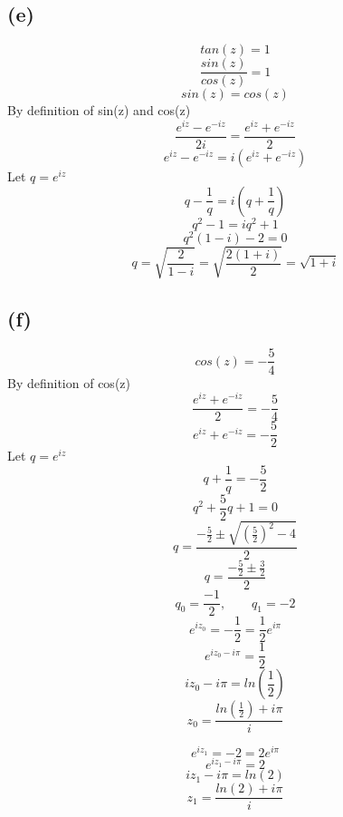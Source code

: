 \documentclass{article}
\begin{document}
\subsection*{(e)}
\[
   tan(z) = 1
\]
\[
   \frac{sin(z)}{cos(z)} = 1
\]
\[
   sin(z) = cos(z)
\]
By definition of sin(z) and cos(z)
\[
   \frac{e^{iz} - e^{-iz}}{2i} = \frac{e^{iz} + e^{-iz}}{2}
\]
\[
   e^{iz} - e^{-iz} = i(e^{iz} + e^{-iz})
\]
Let \(q = e^{iz}\)
\[
   q - \frac{1}{q} = i(q + \frac{1}{q})
\]
\[
   q^2 - 1 = iq^2 + 1
\]
\[
   q^2(1-i) - 2 = 0
\]
\[
   q = \sqrt{\frac{2}{1-i}} = \sqrt{\frac{2(1+i)}{2}} = \sqrt{1 + i}
\]

\subsection*{(f)}
\[
   cos(z) = -\frac{5}{4}
\]
By definition of cos(z)
\[
   \frac{e^{iz} + e^{-iz}}{2} = -\frac{5}{4}
\]
\[
   e^{iz} + e^{-iz} = -\frac{5}{2}
\]
Let \(q = e^{iz}\)
\[
   q + \frac{1}{q} = -\frac{5}{2}
\]
\[
   q^2 + \frac{5}{2}q + 1 = 0
\]
\[
   q = \frac{-\frac{5}{2} \pm \sqrt{(\frac{5}{2})^2 - 4}}{2}
\]
\[
   q = \frac{-\frac{5}{2} \pm \frac{3}{2}}{2}
\]
\[
   q_0 = \frac{-1}{2}, \qquad q_1 = -2
\]
\[
   e^{iz_0} = -\frac{1}{2} = \frac{1}{2}e^{i\pi}
\]
\[
   e^{iz_0 -i\pi} = \frac{1}{2}
\]
\[
   iz_0 - i\pi = ln(\frac{1}{2})
\]
\[
   z_0 = \frac{ln(\frac{1}{2}) + i\pi}{i}
\]

\[
   e^{iz_1} = -2 = 2e^{i\pi}
\]
\[
   e^{iz_1 - i\pi} = 2
\]
\[
   iz_1 - i\pi = ln(2)
\]
\[
   z_1 = \frac{ln(2) + i\pi}{i}
\]
\end{document}
